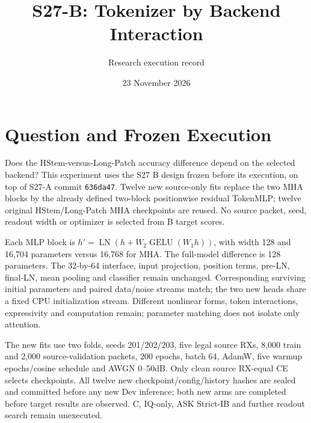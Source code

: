 \documentclass[10pt]{article}
\title{S27-B: Tokenizer by Backend Interaction}
\author{Research execution record}\date{23 November 2026}
\begin{document}
\maketitle
\section{Question and Frozen Execution}
Does the HStem-versus-Long-Patch accuracy difference depend on the selected backend? This experiment uses the S27 B design frozen before its execution, on top of S27-A commit \texttt{636da47}. Twelve new source-only fits replace the two MHA blocks by the already defined two-block positionwise residual TokenMLP; twelve original HStem/Long-Patch MHA checkpoints are reused. No source packet, seed, readout width or optimizer is selected from B target scores.

Each MLP block is $h'=\operatorname{LN}(h+W_2\operatorname{GELU}(W_1h))$, with width 128 and 16,704 parameters versus 16,768 for MHA. The full-model difference is 128 parameters. The 32-by-64 interface, input projection, position terms, pre-LN, final-LN, mean pooling and classifier remain unchanged. Corresponding surviving initial parameters and paired data/noise streams match; the two new heads share a fixed CPU initialization stream. Different nonlinear forms, token interactions, expressivity and computation remain; parameter matching does not isolate only attention.

The new fits use two folds, seeds 201/202/203, five legal source RXs, 8,000 train and 2,000 source-validation packets, 200 epochs, batch 64, AdamW, five warmup epochs/cosine schedule and AWGN 0--50dB. Only clean source RX-equal CE selects checkpoints. All twelve new checkpoint/config/history hashes are sealed and committed before any new Dev inference; both new arms are completed before target results are observed. C, IQ-only, ASK Strict-IB and further readout search remain unexecuted.
\end{document}
